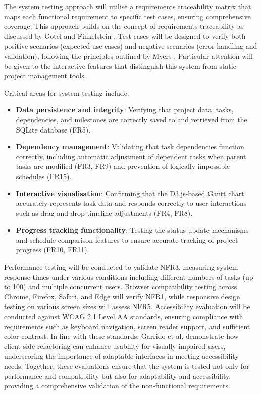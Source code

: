 \documentclass[12pt,nonacm,acmlarge,titlepage,screen]{acmart}
\begin{document}
The system testing approach will utilise a requirements traceability matrix that maps each functional requirement to specific test cases, ensuring comprehensive coverage. This approach builds on the concept of requirements traceability as discussed by Gotel and Finkelstein \cite{gotel_1994}. Test cases will be designed to verify both positive scenarios (expected use cases) and negative scenarios (error handling and validation), following the principles outlined by Myers \cite{myers_2012}. Particular attention will be given to the interactive features that distinguish this system from static project management tools.

Critical areas for system testing include:
\begin{itemize}
    \item \textbf{Data persistence and integrity}: Verifying that project data, tasks, dependencies, and milestones are correctly saved to and retrieved from the SQLite database (FR5).
    \item \textbf{Dependency management}: Validating that task dependencies function correctly, including automatic adjustment of dependent tasks when parent tasks are modified (FR3, FR9) and prevention of logically impossible schedules (FR15).
    \item \textbf{Interactive visualisation}: Confirming that the D3.js-based Gantt chart accurately represents task data and responds correctly to user interactions such as drag-and-drop timeline adjustments (FR4, FR8).
    \item \textbf{Progress tracking functionality}: Testing the status update mechanisms and schedule comparison features to ensure accurate tracking of project progress (FR10, FR11).
\end{itemize}
Performance testing will be conducted to validate NFR3, measuring system response times under various conditions including different numbers of tasks (up to 100) and multiple concurrent users. Browser compatibility testing across Chrome, Firefox, Safari, and Edge will verify NFR1, while responsive design testing on various screen sizes will assess NFR5. Accessibility evaluation will be conducted against WCAG 2.1 Level AA standards, ensuring compliance with requirements such as keyboard navigation, screen reader support, and sufficient color contrast. In line with these standards, Garrido et al. \cite{garrido_2013} demonstrate how client-side refactoring can enhance usability for visually impaired users, underscoring the importance of adaptable interfaces in meeting accessibility needs. Together, these evaluations ensure that the system is tested not only for performance and compatibility but also for adaptability and accessibility, providing a comprehensive validation of the non-functional requirements.
\end{document}

